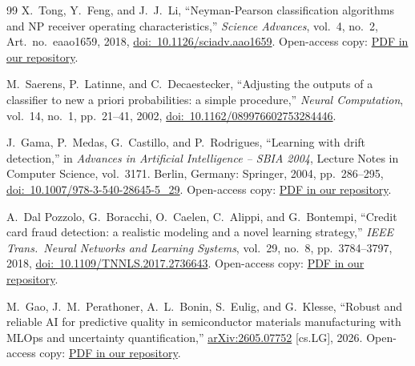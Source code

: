 \documentclass[11pt,a4paper]{article}
\begin{document}
\begin{thebibliography}{99}
X.~Tong, Y.~Feng, and J.~J.~Li, ``Neyman-Pearson classification algorithms and NP receiver operating characteristics,'' \textit{Science Advances}, vol.~4, no.~2, Art.~no.~eaao1659, 2018, \href{https://doi.org/10.1126/sciadv.aao1659}{doi:~10.1126/sciadv.aao1659}. Open-access copy: \href{https://github.com/bodhi584/aoi-false-call-classification/blob/main/docs/papers/14_tong_2018_arxiv.pdf}{PDF in our repository}.

M.~Saerens, P.~Latinne, and C.~Decaestecker, ``Adjusting the outputs of a classifier to new a priori probabilities: a simple procedure,'' \textit{Neural Computation}, vol.~14, no.~1, pp.~21--41, 2002, \href{https://doi.org/10.1162/089976602753284446}{doi:~10.1162/089976602753284446}.

J.~Gama, P.~Medas, G.~Castillo, and P.~Rodrigues, ``Learning with drift detection,'' in \textit{Advances in Artificial Intelligence -- SBIA 2004}, Lecture Notes in Computer Science, vol.~3171. Berlin, Germany: Springer, 2004, pp.~286--295, \href{https://doi.org/10.1007/978-3-540-28645-5_29}{doi:~10.1007/978-3-540-28645-5\_29}. Open-access copy: \href{https://github.com/bodhi584/aoi-false-call-classification/blob/main/docs/papers/16_gama_2004_sbia_authorcopy.pdf}{PDF in our repository}.

A.~Dal Pozzolo, G.~Boracchi, O.~Caelen, C.~Alippi, and G.~Bontempi, ``Credit card fraud detection: a realistic modeling and a novel learning strategy,'' \textit{IEEE Trans.\ Neural Networks and Learning Systems}, vol.~29, no.~8, pp.~3784--3797, 2018, \href{https://doi.org/10.1109/TNNLS.2017.2736643}{doi:~10.1109/TNNLS.2017.2736643}. Open-access copy: \href{https://github.com/bodhi584/aoi-false-call-classification/blob/main/docs/papers/17_dalpozzolo_2018_tnnls.pdf}{PDF in our repository}.

M.~Gao, J.~M.~Perathoner, A.~L.~Bonin, S.~Eulig, and G.~Klesse, ``Robust and reliable AI for predictive quality in semiconductor materials manufacturing with MLOps and uncertainty quantification,'' \href{https://arxiv.org/abs/2605.07752}{arXiv:2605.07752} [cs.LG], 2026. Open-access copy: \href{https://github.com/bodhi584/aoi-false-call-classification/blob/main/docs/papers/18_gao_2026_arxiv.pdf}{PDF in our repository}.

\end{thebibliography}
\end{document}
